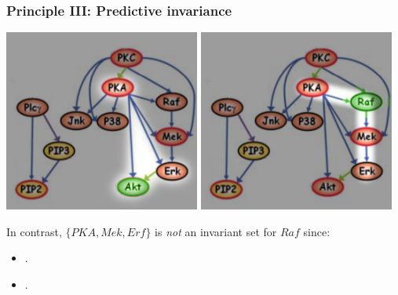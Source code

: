 \documentclass{beamer}
\begin{document}
\begin{frame}
\frametitle{Principle III: Predictive invariance}
\begin{center}
\includegraphics[scale = 0.5]{../images/fig04_01.png}\hspace{0.5in}
\includegraphics[scale = 0.5]{../images/fig05_01.png}
\end{center}

In contrast, $\{PKA, Mek, Erf\}$ is \emph{not} an invariant set for $Raf$ since:

\begin{itemize}
\item .
\item .
\end{itemize}

\end{frame}
\end{document}
